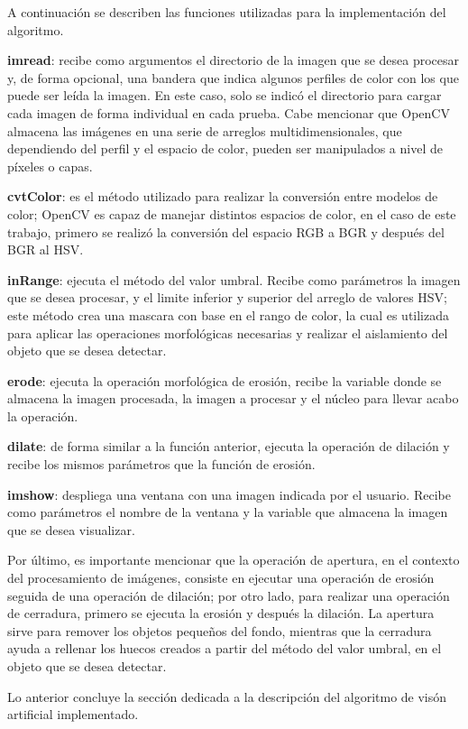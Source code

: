 A continuación se describen las funciones utilizadas para la implementación del algoritmo.

\textbf{imread}: recibe como argumentos el directorio de la imagen que se desea procesar y, de forma opcional, una bandera que indica algunos perfiles de color con los que puede ser leída la imagen. En este caso, solo se indicó el directorio para cargar cada imagen de forma individual en cada prueba. Cabe mencionar que OpenCV almacena las imágenes en una serie de arreglos multidimensionales, que dependiendo del perfil y el espacio de color, pueden ser manipulados a nivel de píxeles o capas.

\textbf{cvtColor}: es el método utilizado para realizar la conversión entre modelos de color; OpenCV es capaz de manejar distintos espacios de color, en el caso de este trabajo, primero se realizó la conversión del espacio RGB a BGR y después del BGR al HSV.

\textbf{inRange}: ejecuta el método del valor umbral. Recibe como parámetros la imagen que se desea procesar, y el limite inferior y superior del arreglo de valores HSV; este método crea una mascara con base en el rango de color, la cual es utilizada para aplicar las operaciones morfológicas necesarias y realizar el aislamiento del objeto que se desea detectar.

\textbf{erode}: ejecuta la operación morfológica de erosión, recibe la variable donde se almacena la imagen procesada, la imagen a procesar y el núcleo para llevar acabo la operación.

\textbf{dilate}: de forma similar a la función anterior, ejecuta la operación de dilación y recibe los mismos parámetros que la función de erosión.

\textbf{imshow}: despliega una ventana con una imagen indicada por el usuario. Recibe como parámetros el nombre de la ventana y la variable que almacena la imagen que se desea visualizar.

Por último, es importante mencionar que la operación de apertura, en el contexto del procesamiento de imágenes, consiste en ejecutar una operación de erosión seguida de una operación de dilación; por otro lado, para realizar una operación de cerradura, primero se ejecuta la erosión y después la dilación. La apertura sirve para remover los objetos pequeños del fondo, mientras que la cerradura ayuda a rellenar los huecos creados a partir del método del valor umbral, en el objeto que se desea detectar.

Lo anterior concluye la sección dedicada a la descripción del algoritmo de visón artificial implementado.
